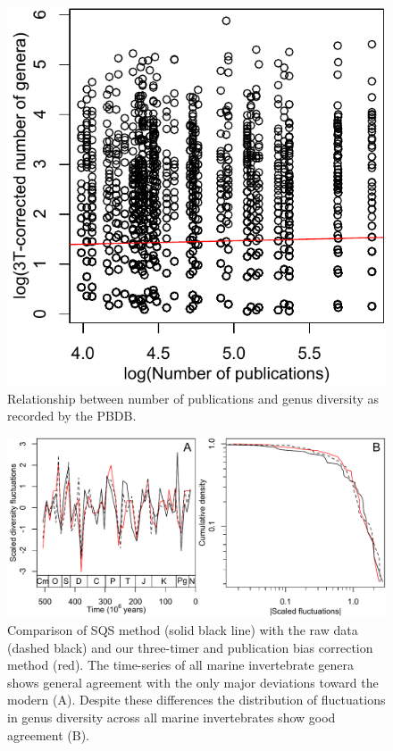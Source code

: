 \begin{figure}[!hp]
  \centering
  \includegraphics[scale=0.7]{figs/figSupp_divByPub.pdf}
  \caption[Relationship between number of publications and genus
  diversity]{Relationship between number of publications and genus
    diversity as recorded by the PBDB.}
  \label{fig:divByPub}
\end{figure}

\begin{figure}[!hp]
  \centering
  \includegraphics[scale=0.7]{figs/figSupp_sqsRaw3tpub.pdf}
  \caption[Comparison of SQS method with the raw data and three-timer
  bias correction method]{Comparison of SQS method \cite{alroy2010}
    (solid black line) with the raw data (dashed black) and our
    three-timer and publication bias correction method (red). The
    time-series of all marine invertebrate genera shows general
    agreement with the only major deviations toward the modern
    (A). Despite these differences the distribution of fluctuations in
    genus diversity across all marine invertebrates show good
    agreement (B).}
  \label{fig:supp_3TPub}
\end{figure}

